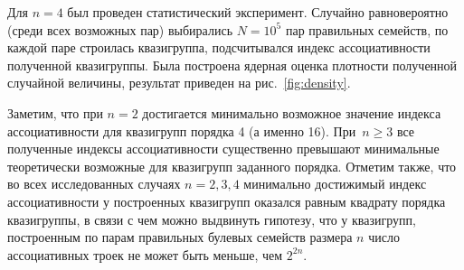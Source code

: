     Для $n = 4$ был проведен статистический эксперимент.
    Случайно равновероятно (среди всех возможных пар) выбирались $N = 10^5$ пар правильных семейств, по каждой паре строилась квазигруппа, подсчитывался индекс ассоциативности полученной квазигруппы.
    Была построена ядерная оценка плотности полученной случайной величины, результат приведен на рис.~\ref{fig:density}.

    \begin{figure}[ht] %
    \end{figure}



    \begin{figure}[ht] %
    \end{figure}

    Заметим, что при $n = 2$ достигается минимально возможное значение индекса ассоциативности для квазигрупп порядка 4 (а именно 16).
    При~$n \ge 3$ все полученные индексы ассоциативности существенно превышают минимальные теоретически возможные для квазигрупп заданного порядка.
    Отметим также, что во всех исследованных случаях $n = 2, 3, 4$ минимально достижимый индекс ассоциативности у построенных квазигрупп оказался равным квадрату порядка квазигруппы, в связи с чем можно выдвинуть гипотезу, что у квазигрупп, построенным по парам правильных булевых семейств размера $n$ число ассоциативных троек не может быть меньше, чем $2^{2n}$.

    \begin{figure}[ht] %
    \end{figure}

